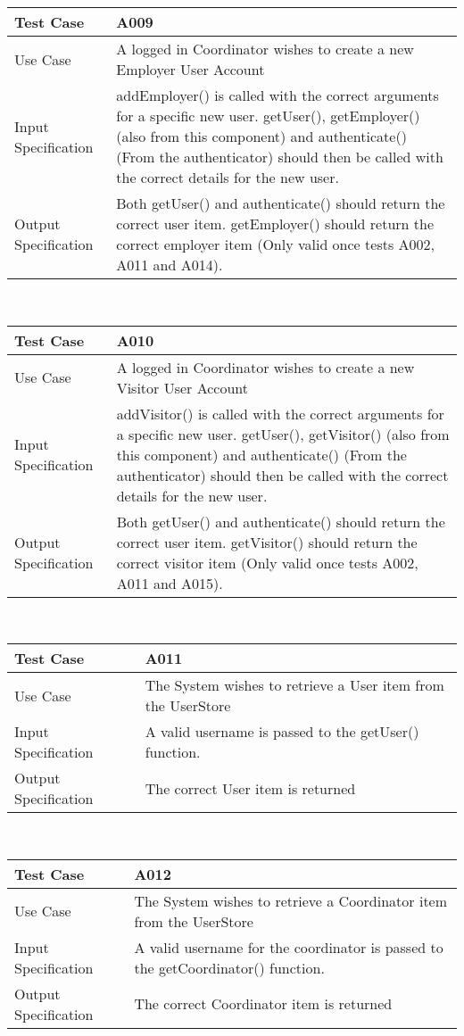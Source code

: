 \documentclass[12pt,a4paper,english,intoc,bibliography=totoc,index=totoc,BCOR10mm,captions=tableheading,titlepage,fleqn]{scrbook}
\providecommand{\tabularnewline}{\\}
\begin{document}
\begin{tabular}{lp{10cm}}
\hline 
\textbf{Test Case} & A009\tabularnewline
\hline 
\hline 
Use Case & A logged in Coordinator wishes to create a new Employer User Account\tabularnewline
\hline 
Input Specification & addEmployer() is called with the correct arguments for a specific new user. getUser(), getEmployer() (also from this component) and authenticate() (From the authenticator) should then be called with the correct details for the new user.\tabularnewline
\hline 
Output Specification & Both getUser() and authenticate() should return the correct user item. getEmployer() should return the correct employer item (Only valid once tests A002, A011 and A014).\tabularnewline
\hline 
\end{tabular}\\

\begin{tabular}{lp{10cm}}
\hline 
\textbf{Test Case} & A010\tabularnewline
\hline 
\hline 
Use Case & A logged in Coordinator wishes to create a new Visitor User Account\tabularnewline
\hline 
Input Specification & addVisitor() is called with the correct arguments for a specific new user. getUser(), getVisitor() (also from this component) and authenticate() (From the authenticator) should then be called with the correct details for the new user.\tabularnewline
\hline 
Output Specification & Both getUser() and authenticate() should return the correct user item. getVisitor() should return the correct visitor item (Only valid once tests A002, A011 and A015).\tabularnewline
\hline 
\end{tabular}\\

\begin{tabular}{lp{10cm}}
\hline 
\textbf{Test Case} & A011\tabularnewline
\hline 
\hline 
Use Case & The System wishes to retrieve a User item from the UserStore\tabularnewline
\hline 
Input Specification & A valid username is passed to the getUser() function.\tabularnewline
\hline 
Output Specification & The correct User item is returned\tabularnewline
\hline 
\end{tabular}\\

\begin{tabular}{lp{10cm}}
\hline 
\textbf{Test Case} & A012\tabularnewline
\hline 
\hline 
Use Case & The System wishes to retrieve a Coordinator item from the UserStore\tabularnewline
\hline 
Input Specification & A valid username for the coordinator is passed to the getCoordinator() function.\tabularnewline
\hline 
Output Specification & The correct Coordinator item is returned\tabularnewline
\hline 
\end{tabular}\\
\end{document}
